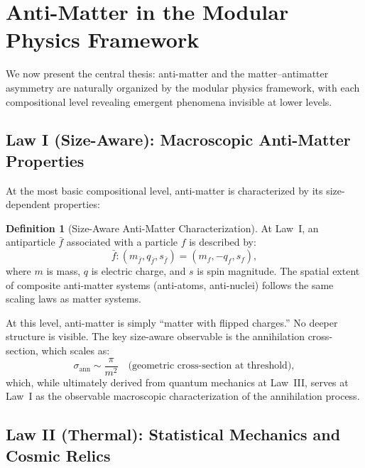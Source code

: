 \documentclass[12pt]{article}
\theoremstyle{definition}
\newtheorem{definition}[theorem]{Definition}
\theoremstyle{remark}
\begin{document}
\section{Anti-Matter in the Modular Physics Framework}
\label{sec:modular}

We now present the central thesis: anti-matter and the matter--antimatter asymmetry
are naturally organized by the modular physics framework, with each compositional
level revealing emergent phenomena invisible at lower levels.

\subsection{Law I (Size-Aware): Macroscopic Anti-Matter Properties}

At the most basic compositional level, anti-matter is characterized by its
size-dependent properties:

\begin{definition}[Size-Aware Anti-Matter Characterization]
At Law~I, an antiparticle $\bar{f}$ associated with a particle $f$ is described by:
\begin{equation}
\bar{f}: (m_{\bar{f}}, q_{\bar{f}}, s_{\bar{f}}) = (m_f, -q_f, s_f),
\end{equation}
where $m$ is mass, $q$ is electric charge, and $s$ is spin magnitude. The spatial
extent of composite anti-matter systems (anti-atoms, anti-nuclei) follows the same
scaling laws as matter systems.
\end{definition}

At this level, anti-matter is simply ``matter with flipped charges.'' No deeper
structure is visible. The key size-aware observable is the annihilation cross-section,
which scales as:
\begin{equation}
\sigma_{\text{ann}} \sim \frac{\pi}{m^2} \quad \text{(geometric cross-section at threshold)},
\end{equation}
which, while ultimately derived from quantum mechanics at Law~III, serves at Law~I
as the observable macroscopic characterization of the annihilation process.

\subsection{Law II (Thermal): Statistical Mechanics and Cosmic Relics}
\end{document}
